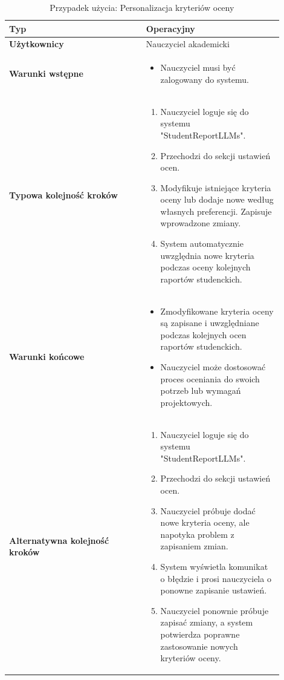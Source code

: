\documentclass[a4paper, 12pt]{article}
\begin{document}
\begin{table}[H]
\footnotesize
\centering
\caption{Przypadek użycia: Personalizacja kryteriów oceny}
\begin{tabular}{|p{0.45\linewidth}|p{0.45\linewidth}|}
\hline
\textbf{Typ} & Operacyjny \\
\hline
\textbf{Użytkownicy} & Nauczyciel akademicki \\
\hline
\textbf{Warunki wstępne} & 
\begin{itemize}
    \item Nauczyciel musi być zalogowany do systemu.
\end{itemize} \\
\hline
\textbf{Typowa kolejność kroków} &
\begin{enumerate}
    \item Nauczyciel loguje się do systemu "StudentReportLLMs".
    \item Przechodzi do sekcji ustawień ocen.
    \item Modyfikuje istniejące kryteria oceny lub dodaje nowe według własnych preferencji. Zapisuje wprowadzone zmiany.
    \item System automatycznie uwzględnia nowe kryteria podczas oceny kolejnych raportów studenckich.
\end{enumerate} \\
\hline
\textbf{Warunki końcowe} & 
\begin{itemize}
    \item Zmodyfikowane kryteria oceny są zapisane i uwzględniane podczas kolejnych ocen raportów studenckich.
    \item Nauczyciel może dostosować proces oceniania do swoich potrzeb lub wymagań projektowych.
\end{itemize} \\
\hline
\textbf{Alternatywna kolejność kroków} &
\begin{enumerate}
    \item Nauczyciel loguje się do systemu "StudentReportLLMs".
    \item Przechodzi do sekcji ustawień ocen.
    \item Nauczyciel próbuje dodać nowe kryteria oceny, ale napotyka problem z zapisaniem zmian.
    \item System wyświetla komunikat o błędzie i prosi nauczyciela o ponowne zapisanie ustawień.
    \item Nauczyciel ponownie próbuje zapisać zmiany, a system potwierdza poprawne zastosowanie nowych kryteriów oceny.
\end{enumerate} \\

\end{tabular}
\end{table}
\end{document}
